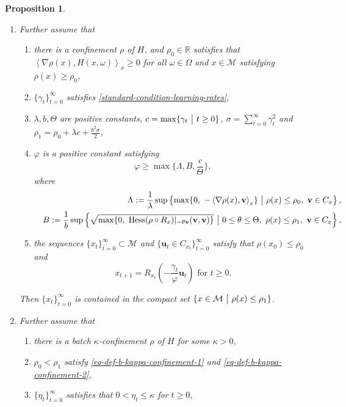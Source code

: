 \documentclass{amsart}
\newcommand{\R}{\mathbb{R}}
\newcommand{\vf}{\varphi}
\newcommand{\Hess}{\mathrm{Hess}}
\newcommand{\M}{\mathcal{M}}
\newcommand{\g}{\gamma}
\theoremstyle{plain}
\newtheorem{proposition}[theorem]{Proposition}
\theoremstyle{definition}
\theoremstyle{remark}
\numberwithin{theorem}{section}
\numberwithin{equation}{section}
\begin{document}
\begin{proposition}
\begin{enumerate}[1.]
	\item Further assume that 
	\begin{enumerate}
	  \item there is a confinement $\rho$ of $H$, and $\rho_0\in \R$ satisfies that $\left\langle \nabla \rho (x), H(x,\omega) \right\rangle_x \geq 0$ for all $\omega \in \Omega$ and $x \in \M$ satisfying $\rho(x)\geq \rho_0$,
		\item $\{\g_t\}_{t=0}^\infty$ satisfies \eqref{standard-condition-learning-rates},
		\item $\lambda,b,\Theta$ are positive constants, $c= \max \{\g_t~\big{|}~t\geq 0\}$, $\sigma=\sum_{t=0}^\infty \g_t^2$ and $\rho_1 =\rho_0+ \lambda c + \frac{b^2\sigma}{2}$,
		\item $\vf$ is a positive constant satisfying 
	\begin{equation}\label{eq-def-vf}
	\vf\geq \max\{\Lambda,B,\frac{c}{\Theta}\},
	\end{equation}
	where
	\begin{eqnarray*}
	&& \Lambda:= \frac{1}{\lambda}\sup\left\{\max\{0, ~-\left\langle  \nabla\rho(x),\mathbf{v}\right\rangle_{x}\}~\big{|}~\rho(x)\leq \rho_0,~\mathbf{v}\in C_x\right\}, \\
	&& B:= \frac{1}{b} \sup\left\{\sqrt{\max\{0, ~\Hess(\rho\circ R_{x})|_{-\theta\mathbf{v}}(\mathbf{v},\mathbf{v})\}}~\big{|}~0\leq \theta \leq \Theta,~\rho(x)\leq \rho_1,~\mathbf{v}\in C_x\right\},
	\end{eqnarray*}
		\item the sequences $\{x_t\}_{t=0}^\infty\subset \M$ and $\{\mathbf{u}_t \in C_{x_t}\}_{t=0}^\infty$ satisfy that $\rho(x_0) \leq \rho_0$ and
		\begin{equation}\label{eq-def-x-t-deterministic}
x_{t+1} = R_{x_t}\left(-\frac{\g_t}{\vf}\mathbf{u}_t\right) \text{ for } t\geq 0.
\end{equation}
	\end{enumerate}
	Then $\{x_t\}_{t=0}^\infty$ is contained in the compact set $\{x\in \M ~\big{|}~ \rho(x)\leq \rho_1\}$.
	\item Further assume that
	\begin{enumerate}
		\item there is a batch $\kappa$-confinement $\rho$ of $H$ for some $\kappa>0$, 
		\item $\rho_0<\rho_1$ satisfy \eqref{eq-def-b-kappa-confinement-1} and \eqref{eq-def-b-kappa-confinement-2}, 
		\item $\{\eta_t\}_{t=0}^\infty$ satisfies that $0<\eta_t\leq \kappa$ for $t\geq 0$,

\end{enumerate}
\end{enumerate}
\end{proposition}
\end{document}
